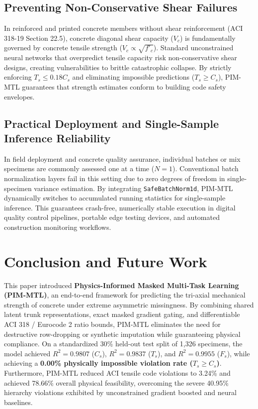 \documentclass[conference]{IEEEtran}
\begin{document}
\subsection{Preventing Non-Conservative Shear Failures}
In reinforced and printed concrete members without shear reinforcement (ACI 318-19 Section 22.5), concrete diagonal shear capacity ($V_c$) is fundamentally governed by concrete tensile strength ($V_c \propto \sqrt{f'_c}$). Standard unconstrained neural networks that overpredict tensile capacity risk non-conservative shear designs, creating vulnerabilities to brittle catastrophic collapse. By strictly enforcing $T_s \le 0.18 C_s$ and eliminating impossible predictions ($T_s \ge C_s$), PIM-MTL guarantees that strength estimates conform to building code safety envelopes.

\subsection{Practical Deployment and Single-Sample Inference Reliability}
In field deployment and concrete quality assurance, individual batches or mix specimens are commonly assessed one at a time ($N=1$). Conventional batch normalization layers fail in this setting due to zero degrees of freedom in single-specimen variance estimation. By integrating \texttt{SafeBatchNorm1d}, PIM-MTL dynamically switches to accumulated running statistics for single-sample inference. This guarantees crash-free, numerically stable execution in digital quality control pipelines, portable edge testing devices, and automated construction monitoring workflows.

\section{Conclusion and Future Work}

This paper introduced \textbf{Physics-Informed Masked Multi-Task Learning (PIM-MTL)}, an end-to-end framework for predicting the tri-axial mechanical strength of concrete under extreme asymmetric missingness. By combining shared latent trunk representations, exact masked gradient gating, and differentiable ACI 318 / Eurocode 2 ratio bounds, PIM-MTL eliminates the need for destructive row-dropping or synthetic imputation while guaranteeing physical compliance. On a standardized 30\% held-out test split of 1,326 specimens, the model achieved $R^2 = 0.9807$ ($C_s$), $R^2 = 0.9837$ ($T_s$), and $R^2 = 0.9955$ ($F_s$), while achieving a \textbf{0.00\% physically impossible violation rate ($T_s \ge C_s$)}. Furthermore, PIM-MTL reduced ACI tensile code violations to 3.24\% and achieved 78.66\% overall physical feasibility, overcoming the severe 40.95\% hierarchy violations exhibited by unconstrained gradient boosted and neural baselines.
\end{document}
